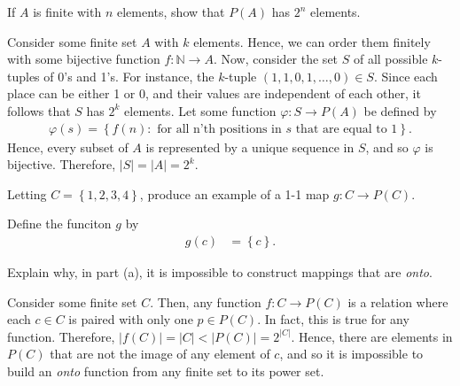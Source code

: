 \documentclass[12pt]{article}
\newcommand{\N}{\mathbb{N}}
\newenvironment{problem}[2][Problem]{\begin{trivlist} \item[\hskip \labelsep {\bfseries #1}\hskip \labelsep {\bfseries #2.}]}{\end{trivlist}}
\newenvironment{solution}[2][Solution]{\begin{trivlist} \item[\hskip \labelsep {\bfseries #1}\hskip \labelsep {\bfseries #2.}]}{\end{trivlist}}
\begin{document}
\begin{problem}{1.6.5}
      If $A$ is finite with $n$ elements, show that $P(A)$ has $2^{n}$ elements.
      \begin{solution}{1.6.5}
	Consider some finite set $A$ with $k$ elements. Hence, we can order them finitely with some bijective function $f:\N\to A$. Now, consider the set $S$ of all possible $k$-tuples of 0's and 1's. For instance, the $k$-tuple $(1,1,0,1,\dots,0)\in S$. Since each place can be either 1 or 0, and their values are independent of each other, it follows that $S$ has $2^{k}$ elements. Let some function $\varphi:S \to P(A)$ be defined by
	\begin{align*}
	  \varphi(s)=\left\{f(n):\text{ for all n'th positions in }s\text{ that are equal to 1}\right\}.
	\end{align*}
	Hence, every subset of $A$ is represented by a unique sequence in $S$, and so $\varphi$ is bijective. Therefore, $|S|=|A|=2^{k}$. 
      \end{solution}
\end{problem}

\begin{problem}{1.6.6}
  \begin{enumerate}[label=(\alph*)]
    \item Letting $C=\left\{1,2,3,4\right\}$, produce an example of a 1-1 map $g:C\to P(C)$.
      \begin{solution}{(a)}
	   Define the funciton $g$ by 
	   \begin{align*}
	     g(c) &= \left\{c\right\}.
	   \end{align*}
	\end{solution}
     \item Explain why, in part (a), it is impossible to construct mappings that are \textit{onto}.
       \begin{solution}{(b)}
	 Consider some finite set $C$. Then, any function $f:C\to P(C)$ is a relation where each $c\in C$ is paired with only one $p\in P(C)$. In fact, this is true for any function. Therefore, $|f(C)|=|C|< |P(C)| = 2^{|C|}$. Hence, there are elements in $P(C)$ that are not the image of any element of $c$, and so it is impossible to build an \textit{onto} function from any finite set to its power set.
       \end{solution}
  \end{enumerate}
   
\end{problem}
\end{document}
